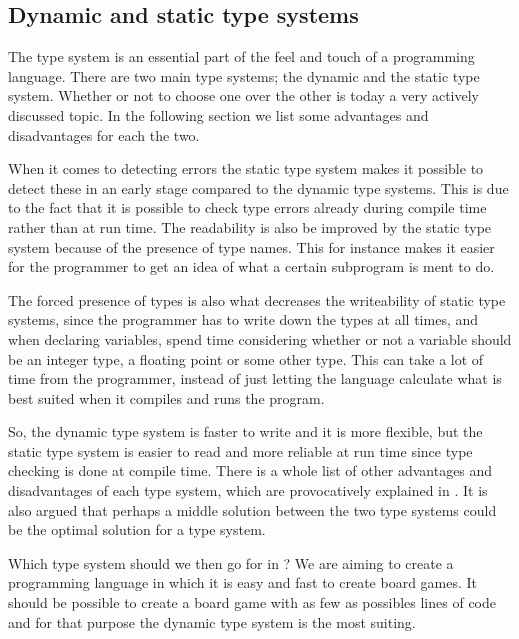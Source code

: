 \subsection{Dynamic and static type systems}

The type system is an essential part of the feel and touch of a programming
language. There are two main type systems; the dynamic and the static
type system. Whether or not to choose one over the other is today a very
actively discussed topic. In the following section we list some advantages and
disadvantages for each the two.

When it comes to detecting errors the static type system makes it possible to
detect these in an early stage compared to the dynamic type systems. This is
due to the fact that it is possible to check type errors already during
compile time rather than at run time. The readability is also be improved by
the static type system because of the presence of type names. This for instance
makes it easier for the programmer to get an idea of what a certain
subprogram is ment to do. 

The forced presence of types is also what decreases the writeability of static
type systems, since the programmer has to write down the types at all times, and
when declaring variables, spend time considering whether or not a variable
should be an integer type, a floating point or some other type. This can take
a lot of time from the programmer, instead of just letting the language calculate 
what is best suited when it compiles and runs the program.

So, the dynamic type system is faster to write and it is more flexible, but the
static type system is easier to read and more reliable at run time since type
checking is done at compile time. There is a whole list of other advantages and
disadvantages of each type system, which are provocatively explained in
\cite{staticvsdynamictypesystem}. It is also argued that perhaps a middle
solution between the two type systems could be the optimal solution for a type
system.

Which type system should we then go for in \productname{}? We are aiming to create a
programming language in which it is easy and fast to create board games. It
should be possible to create a board game with as few as possibles lines of code
and for that purpose the dynamic type system is the most suiting.
